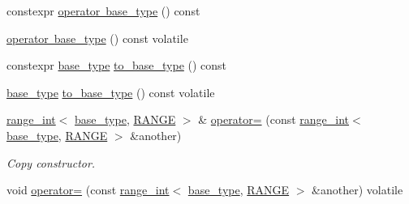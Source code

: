 \begin{DoxyCompactItemize}
constexpr \mbox{\hyperlink{classfsl_1_1ver1__0_1_1lg_1_1range__int_a27eef78b506dd014d3da4e9491384b0b}{operator base\+\_\+type}} () const
\item 
\mbox{\hyperlink{classfsl_1_1ver1__0_1_1lg_1_1range__int_a890a47ac6ae9e356a47f7f8849d8a766}{operator base\+\_\+type}} () const volatile
\item 
constexpr \mbox{\hyperlink{classfsl_1_1ver1__0_1_1lg_1_1range__int_af14c814b65a761cd387e7577eb2ef78c}{base\+\_\+type}} \mbox{\hyperlink{classfsl_1_1ver1__0_1_1lg_1_1range__int_a894ce41b6d04eccbde3ea8247ba7dde3}{to\+\_\+base\+\_\+type}} () const
\item 
\mbox{\hyperlink{classfsl_1_1ver1__0_1_1lg_1_1range__int_af14c814b65a761cd387e7577eb2ef78c}{base\+\_\+type}} \mbox{\hyperlink{classfsl_1_1ver1__0_1_1lg_1_1range__int_afa20f93fb03e93bc7c3db5b6427e2b68}{to\+\_\+base\+\_\+type}} () const volatile
\item 
\mbox{\label{classfsl_1_1ver1__0_1_1lg_1_1range__int_a44f07675730ee02cc4d01ba56c09a9cf}} 
\mbox{\hyperlink{classfsl_1_1ver1__0_1_1lg_1_1range__int}{range\+\_\+int}}$<$ \mbox{\hyperlink{classfsl_1_1ver1__0_1_1lg_1_1range__int_af14c814b65a761cd387e7577eb2ef78c}{base\+\_\+type}}, \mbox{\hyperlink{classfsl_1_1ver1__0_1_1lg_1_1range__int_a48e6f92039600251a43bd027a8a5aa10}{R\+A\+N\+GE}} $>$ \& \mbox{\hyperlink{classfsl_1_1ver1__0_1_1lg_1_1range__int_a44f07675730ee02cc4d01ba56c09a9cf}{operator=}} (const \mbox{\hyperlink{classfsl_1_1ver1__0_1_1lg_1_1range__int}{range\+\_\+int}}$<$ \mbox{\hyperlink{classfsl_1_1ver1__0_1_1lg_1_1range__int_af14c814b65a761cd387e7577eb2ef78c}{base\+\_\+type}}, \mbox{\hyperlink{classfsl_1_1ver1__0_1_1lg_1_1range__int_a48e6f92039600251a43bd027a8a5aa10}{R\+A\+N\+GE}} $>$ \&another)
\begin{DoxyCompactList}\small\item\em Copy constructor. \end{DoxyCompactList}\item 
\mbox{\label{classfsl_1_1ver1__0_1_1lg_1_1range__int_a49a8057bcd87ae83cd3844570815296a}} 
void \mbox{\hyperlink{classfsl_1_1ver1__0_1_1lg_1_1range__int_a49a8057bcd87ae83cd3844570815296a}{operator=}} (const \mbox{\hyperlink{classfsl_1_1ver1__0_1_1lg_1_1range__int}{range\+\_\+int}}$<$ \mbox{\hyperlink{classfsl_1_1ver1__0_1_1lg_1_1range__int_af14c814b65a761cd387e7577eb2ef78c}{base\+\_\+type}}, \mbox{\hyperlink{classfsl_1_1ver1__0_1_1lg_1_1range__int_a48e6f92039600251a43bd027a8a5aa10}{R\+A\+N\+GE}} $>$ \&another) volatile

\end{DoxyCompactItemize}
